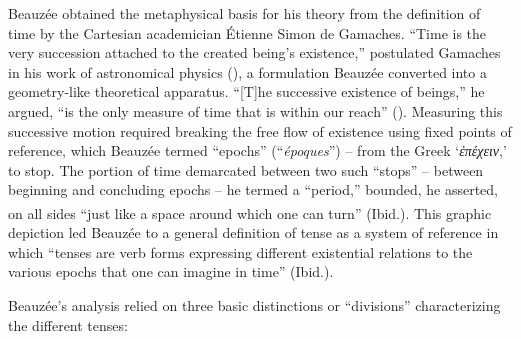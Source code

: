 \documentclass[output=paper]{langsci/langscibook}
\begin{document}
 Beauzée obtained the metaphysical basis for his theory from the definition of time by the Cartesian academician Étienne Simon de Gamaches. “Time is the very succession attached to the created being’s existence,” postulated Gamaches in his work of astronomical physics (\citeyear[28]{gamaches_astronomie_1740}), a formulation Beauzée converted into a geometry\nobreakdash-like theoretical apparatus. “[T]he successive existence of beings,” he argued, “is the only measure of time that is within our reach” (\citealt[96]{beauzee_tems_1765}). Measuring this successive motion required breaking the free flow of existence using fixed points of reference, which Beauzée termed “epochs” (“\textit{époques}”) -- from the Greek ‘\textit{ἐπέχειν},’ to stop. The portion of time demarcated between two such “stops” -- between beginning and concluding epochs -- he termed a “period,” bounded, he asserted, on all sides “just like a space around which one can turn”\textsuperscript{} (Ibid.). This graphic depiction led Beauzée to a general definition of tense as a system of reference in which “tenses are verb forms expressing different existential relations to the various epochs that one can imagine in time” (Ibid.).
 
 Beauzée’s analysis relied on three basic distinctions or “divisions” characterizing the different tenses:
 
\end{document}
